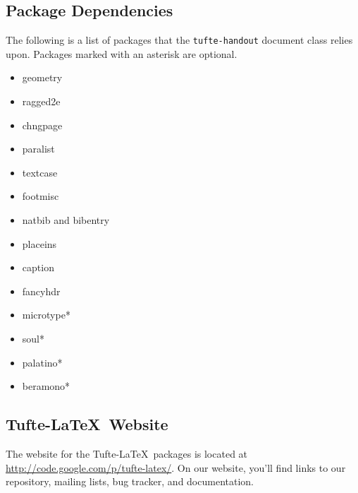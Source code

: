 \documentclass{tufte-handout}
\begin{document}
\subsection{Package Dependencies}\label{sec:dependencies}
The following is a list of packages that the \Verb|tufte-handout| document
class relies upon.  Packages marked with an asterisk are optional.
\begin{multicols}{2}
\begin{itemize}
  \item geometry
  \item ragged2e
  \item chngpage
  \item paralist
  \item textcase
  \item footmisc
  \item natbib and bibentry
  \item placeins
  \item caption
  \item fancyhdr 
  \item microtype*
  \item soul*
  \item palatino*
  \item beramono*
\end{itemize}
\end{multicols}

\subsection{Tufte-\LaTeX\ Website}\label{sec:website}
The website for the Tufte-\LaTeX\ packages is located at
\url{http://code.google.com/p/tufte-latex/}.  On our website, you'll find
links to our  repository, mailing lists, bug tracker, and documentation.





\end{document}
